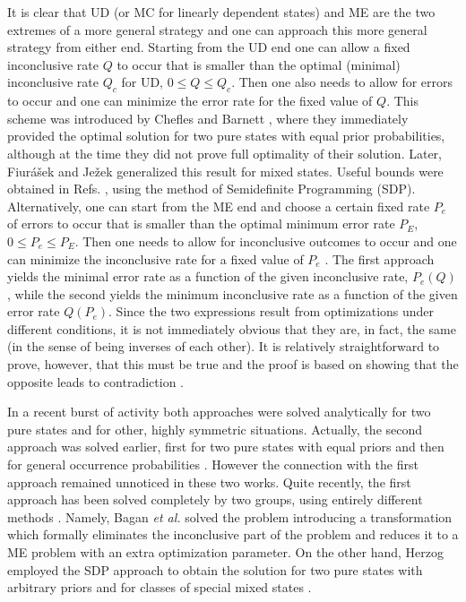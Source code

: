 \documentclass[aps,pra,twocolumn,eqsecnum,showpacs]{revtex4}
\begin{document}
It is clear that UD (or MC for linearly dependent states) and ME are the two extremes of a more general strategy and one can approach this more general strategy from either end. Starting from the UD end one can allow a fixed inconclusive rate $Q$ to occur that is smaller than the optimal (minimal) inconclusive rate $Q_{c}$ for UD, $0 \leq Q \leq Q_{c}$. Then one also needs to allow for errors to occur and one can minimize the error rate for the fixed value of $Q$. This scheme was introduced by Chefles and Barnett \cite{chefles2}, where they immediately provided the optimal solution for two pure states with equal prior probabilities, although at the time they did not prove full optimality of their solution. Later, Fiur\'{a}\v{s}ek and Je\v{z}ek \cite{fiurasek} generalized this result for mixed states. Useful bounds were obtained in Refs. \cite{zhang,eldar}, using the method of Semidefinite Programming (SDP). Alternatively,  one can start from the ME end and choose a certain fixed rate $P_{e}$ of errors to occur that is smaller than the optimal minimum error rate $P_{E}$, $0 \leq P_{e} \leq P_{E}$. Then one needs to allow for inconclusive outcomes to occur and one can minimize the inconclusive rate for a fixed value of $P_{e}$ \cite{touzel}. The first approach yields the minimal error rate as a function of the given inconclusive rate, $P_{e}(Q)$, while the second yields the minimum inconclusive rate as a function of the given error rate $Q(P_{e})$. Since the two expressions result from optimizations under different conditions, it is not immediately obvious that they are, in fact, the same (in the sense of being inverses of each other). It is relatively straightforward to prove, however, that this must be true and the proof is based on showing that the opposite leads to contradiction \cite{herzog2}. 

In a recent burst of activity both approaches were solved analytically for two pure states and for other, highly symmetric situations.   Actually, the second approach was solved earlier, first for two pure states with equal priors \cite{hayashi} and then for general occurrence probabilities \cite{sugimoto}. However the connection with the first approach remained unnoticed in these two works.  Quite recently, the first approach has been solved completely by two groups, using entirely different methods \cite{Bagan,Herzog1}.  Namely, Bagan  \textit{et al.} \cite{Bagan}
solved the problem introducing a transformation which formally eliminates the inconclusive part of the problem and reduces it to a ME problem with an extra optimization parameter. On the other hand, Herzog employed the SDP approach to obtain the solution for two pure states with arbitrary priors and for classes of special mixed states \cite{Herzog1}.
\end{document}
